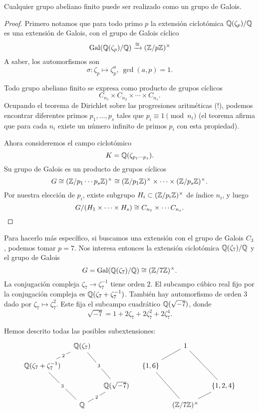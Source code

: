 \begin{proposicion}
  Cualquier grupo abeliano finito puede ser realizado como un grupo de Galois.

  \begin{proof}
    Primero notamos que para todo primo $p$ la extensión ciclotómica
    $\mathbb{Q} (\zeta_p)/\mathbb{Q}$ es una extensión de Galois, con el grupo de Galois
    cíclico
    $$\operatorname{Gal} (\mathbb{Q} (\zeta_p)/\mathbb{Q}) \xrightarrow{\cong} (\mathbb{Z}/p\mathbb{Z})^\times$$
    A saber, los automorfismos son
    $$\sigma\colon \zeta_p \mapsto \zeta_p^a, ~ \gcd (a,p) = 1.$$

    Todo grupo abeliano finito se expresa como producto de grupos cíclicos
    $$C_{n_1} \times C_{n_2} \times \cdots \times C_{n_s}.$$
    Ocupando el teorema de Dirichlet sobre las progresiones aritméticas (!),
    podemos encontrar diferentes primos $p_1,\ldots,p_s$ tales que
    $p_i \equiv 1 \pmod{n_i}$ (el teorema afirma que para cada $n_i$ existe un
    número infinito de primos $p_i$ con esta propiedad).

    Ahora consideremos el campo ciclotómico
    $$K = \mathbb{Q} (\zeta_{p_1\cdots p_s}).$$
    Su grupo de Galois es un producto de grupos cíclicos
    \[ G \cong (\mathbb{Z}/p_1\cdots p_s\mathbb{Z})^\times
       \cong (\mathbb{Z}/p_1\mathbb{Z})^\times \times \cdots \times (\mathbb{Z}/p_s\mathbb{Z})^\times. \]
    Por nuestra elección de $p_i$, existe subgrupo
    $H_i \subset (\mathbb{Z}/p_i\mathbb{Z})^\times$ de índice $n_i$, y luego
    \[ G/(H_1\times \cdots \times H_s) \cong C_{n_1} \times \cdots C_{n_s}. \qedhere \]
  \end{proof}
\end{proposicion}

\begin{ejemplo}
  Para hacerlo más específico, si buscamos una extensión con el grupo de Galois
  $C_3$, podemos tomar $p = 7$. Nos interesa entonces la extensión ciclotómica
  $\mathbb{Q} (\zeta_7)/\mathbb{Q}$ y el grupo de Galois
  $$G = \operatorname{Gal} (\mathbb{Q} (\zeta_7)/\mathbb{Q}) \cong (\mathbb{Z}/7\mathbb{Z})^\times.$$
  La conjugación compleja $\zeta_7 \to \zeta_7^{-1}$ tiene orden $2$.
  El subcampo cúbico real fijo por la conjugación compleja es
  $\mathbb{Q} (\zeta_7 + \zeta_7^{-1})$.
  También hay automorfismo de orden $3$ dado por $\zeta_7 \mapsto \zeta_7^2$.
  Este fija el subcampo cuadrático $\mathbb{Q} (\sqrt{-7})$, donde
  $$\sqrt{-7} = 1 + 2\zeta_7 + 2\zeta_7^2 + 2\zeta_7^4.$$

  Hemos descrito todas las posibles subextensiones:
  \[ \begin{tikzcd}[row sep=1em,column sep=1em]
    & \QQ (\zeta_7)\ar[-]{dl}[description]{2}\ar[-]{ddr}[description]{3} & & & 1\ar[-]{dl}\ar[-]{ddr} \\
    \QQ (\zeta_7 + \zeta_7^{-1})\ar[-]{ddr}[description]{3} & & & \{ 1, 6 \}\ar[-]{ddr} \\
    & & \QQ (\sqrt{-7}) \ar[-]{dl}[description]{2} & & & \{ 1,2,4 \}\ar[-]{dl} \\
     & \QQ & & & (\ZZ/7\ZZ)^\times
    \end{tikzcd} \]
\end{ejemplo}

